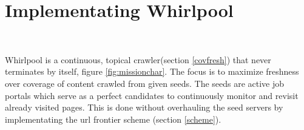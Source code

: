 \chapter{Implementating Whirlpool}\label{implwhirlpool}
\begin{figure*}[h!]
    \centering
    \begin{subfigure}
        \texttt{[image: ../media/crawler/whirlpool-crawl-order.png]}
    \end{subfigure}
    ~
    \begin{subfigure}
        \texttt{[image: ../media/crawler/whirlpool-seed-set.png]}
    \end{subfigure}%
    \caption{Whirlpool seed set \& its crawl ordering policy}
    \label{fig:missionchar}
\end{figure*}

\noindent
Whirlpool is a continuous, topical crawler(section \ref{covfresh}) that never terminates by itself, figure \ref{fig:missionchar}. The focus is to maximize freshness over coverage of content crawled from given seeds. The seeds are active job portals which serve as a perfect candidates to continuously monitor and revisit already visited pages. This is done without overhauling the seed servers by implementating the url frontier scheme (section \ref{scheme}).

\pagebreak